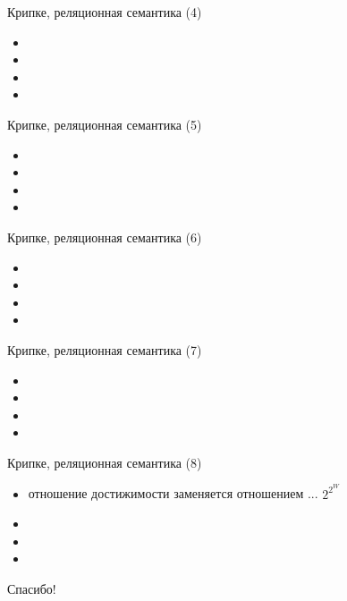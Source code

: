 \documentclass{beamer}
\begin{document}
\begin{frame}{Крипке, реляционная семантика (4)}
\begin{itemize}
  \item 
  \item 
  \item 
  \item 
\end{itemize}
\end{frame}

\begin{frame}{Крипке, реляционная семантика (5)}
\begin{itemize}
  \item 
  \item 
  \item 
  \item 
\end{itemize}
\end{frame}

\begin{frame}{Крипке, реляционная семантика (6)}
\begin{itemize}
  \item 
  \item 
  \item 
  \item 
\end{itemize}
\end{frame}

\begin{frame}{Крипке, реляционная семантика (7)}
\begin{itemize}
  \item 
  \item 
  \item 
  \item 
\end{itemize}
\end{frame}

\begin{frame}{Крипке, реляционная семантика (8)}
\begin{itemize}
  \item отношение достижимости заменяется отношением ... $2^{2^W}$ 
  \item 
  \item 
  \item 
\end{itemize}
\end{frame}


\begin{frame}{}
    \thispagestyle{empty}
    \begin{center}
        {\large Спасибо!}
    \end{center}
\end{frame}


\end{document}
